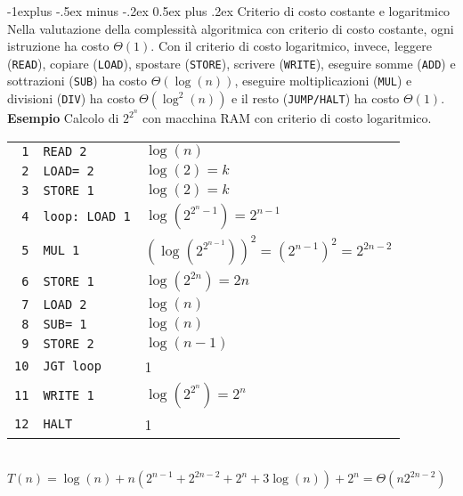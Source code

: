 \documentclass[10pt,landscape]{article}
\makeatletter
\renewcommand{\subsection}{\@startsection{subsection}{2}{0mm}%
                                {-1explus -.5ex minus -.2ex}%
                                {0.5ex plus .2ex}%
                                {\normalfont\large\bfseries}}
\makeatother
\begin{document}
\begin{multicols*}{4}
                \subsection{Criterio di costo costante e logaritmico}
                Nella valutazione della complessità algoritmica con criterio di costo costante, ogni istruzione ha costo $\Theta(1)$. Con il criterio di costo logaritmico, invece, leggere (\texttt{READ}), copiare (\texttt{LOAD}), spostare (\texttt{STORE}), scrivere (\texttt{WRITE}), eseguire somme (\texttt{ADD}) e sottrazioni (\texttt{SUB}) ha costo $\Theta(\log(n))$, eseguire moltiplicazioni (\texttt{MUL}) e divisioni (\texttt{DIV}) ha costo $\Theta(\log^2(n))$ e il resto (\texttt{JUMP/HALT}) ha costo $\Theta(1)$. \\ [5pt]
                \textbf{Esempio} Calcolo di $2^{2^{n}}$ con macchina RAM con criterio di costo logaritmico.\\[5pt]
                \begin{tabular}{r l |l}
                        \texttt{1}  & \texttt{READ 2}       & $\log(n)$                                        \\
                        \texttt{2}  & \texttt{LOAD= 2}      & $\log(2) = k$                                    \\
                        \texttt{3}  & \texttt{STORE 1}      & $\log(2) = k$                                    \\
                        \texttt{4}  & \texttt{loop: LOAD 1} & $\log(2^{2^n-1}) = 2^{n-1}$                      \\
                        \texttt{5}  & \texttt{MUL 1}        & $(\log(2^{2^{n-1}}))^2 = (2^{n-1})^2 = 2^{2n-2}$ \\
                        \texttt{6}  & \texttt{STORE 1}      & $\log(2^{2n}) = 2n$                              \\
                        \texttt{7}  & \texttt{LOAD 2}       & $\log(n)$                                        \\
                        \texttt{8}  & \texttt{SUB= 1}       & $\log(n)$                                        \\
                        \texttt{9}  & \texttt{STORE 2}      & $\log(n-1)$                                      \\
                        \texttt{10} & \texttt{JGT loop}     & 1                                                \\
                        \texttt{11} & \texttt{WRITE 1}      & $\log(2^{2^n}) = 2^n$                            \\
                        \texttt{12} & \texttt{HALT}         & 1                                                \\
                \end{tabular}\\[5pt]
        $T(n)=\log(n)+n(2^{n-1}+2^{2n-2}+2^n+3\log(n))+2^n = \Theta(n2^{2n-2})$

\end{multicols*}
\end{document}
